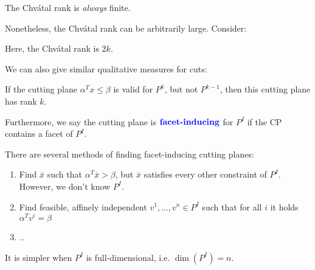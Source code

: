 
\begin{conclusion}
    The Chv\'atal rank is \emph{always} finite.
\end{conclusion}
\begin{remark}
    Nonetheless, the Chv\'atal rank can be arbitrarily large. Consider:
    \vspace{5pt}
    \\
    \begin{minipage}{\textwidth}
        \centering
    \end{minipage}
    Here, the Chv\'atal rank is $2k$.
\end{remark}
We can also give similar qualitative measures for cuts:
\begin{definition}
    If the cutting plane $\alpha^Tx \leq \beta$ is valid for $P^k$, but not $P^{k-1}$, then this cutting plane
    has  rank $k$.

    Furthermore, we say the cutting plane is $\vocab{facet-inducing}$ for $P^I$ if the CP contains a facet of $P^I$.
\end{definition}
There are several methods of finding facet-inducing cutting planes:
\begin{enumerate}
    \item Find $\bar x$ such that $\alpha^T\bar x > \beta$, but $\bar x$ satisfies every other constraint of $P^I$.
          However, we don't know $P^I$.
    \item Find feasible, affinely independent $v^1,\dots,v^n \in P^I$ such that for all $i$ it holds $\alpha^Tv^i = \beta$
    \item ..
\end{enumerate}
It is simpler when $P^I$ is full-dimensional, i.e. $\dim(P^I)=n$.

